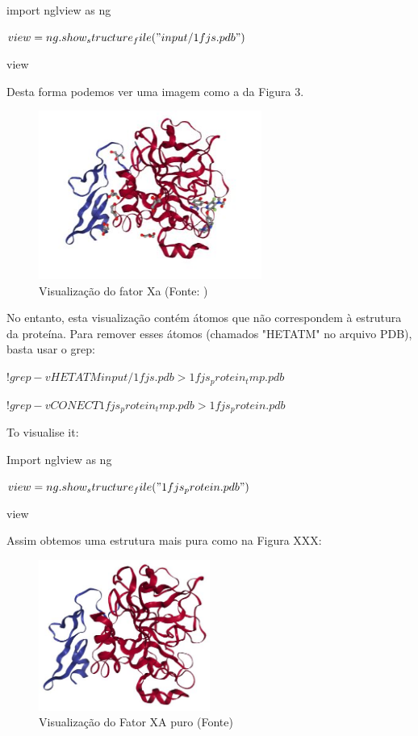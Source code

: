 \documentclass[11pt, letterpaper, portuguese]{article}
\begin{document}
        \par{import nglview as ng}
        \par{$view = ng.show_structure_file("input/1fjs.pdb")$}
        \par{view}
        \\
        
        \par{Desta forma podemos ver uma imagem como a da Figura 3.}
        \begin{figure}
	    \centering
		\caption{Visualização do fator Xa (Fonte: \cite{Villa_2017})}
		\includegraphics[width=0.65\textwidth]{Proteina.JPG}
	\end{figure}
	
\par{No entanto, esta visualização contém átomos que não correspondem à estrutura da proteína. Para remover esses átomos (chamados "HETATM" no arquivo PDB), basta usar o grep:
}

\vspace{0.5 cm}

\par{$!grep -v HETATM input/1fjs.pdb > 1fjs_protein_tmp.pdb$}
\par{$!grep -v CONECT 1fjs_protein_tmp.pdb > 1fjs_protein.pdb$}
\par{To visualise it:}
\par{Import nglview as ng}
\par{$view = ng.show_structure_file("1fjs_protein.pdb")$}
\par{view}
\\

\par{Assim obtemos uma estrutura mais pura como na Figura XXX:}

\begin{figure}
	    \centering
		\caption{Visualização do Fator XA puro (Fonte\cite{Villa_2017})}
		\includegraphics[width=0.5\textwidth]{ProteinaPura.JPG}
	\end{figure}
\end{document}

